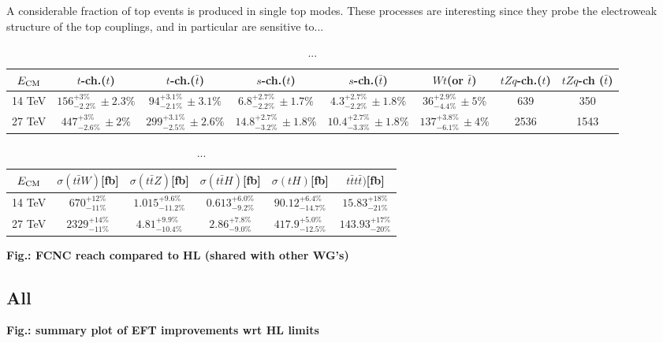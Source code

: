\documentclass{article}
\begin{document}
\vskip 0.3cm
A considerable fraction of top events is produced in single top modes. These processes
are interesting since they probe the electroweak structure of the top couplings, and
in particular are sensitive to...

\begin{table}[htb]
\caption{...}
\label{tab:singlet_yields}
\hskip-3.0cm
\begin{tabular} {|c |c  |c  |c  |c |c | c |c |}
  \hline
  $E_{\rm CM}$ & $t$-ch.($t$)   &  $t$-ch.($\bar{t}$)   &   $s$-ch.($t$) &  $s$-ch.($\bar{t}$)   &  $Wt$(or $\bar{t}$) & $tZq$-ch.($t$) & $tZq$-ch ($\bar{t}$) \\
  \hline
  14 TeV     &  $156^{+3\%}_{-2.2\%} {\scriptstyle \,\pm 2.3\%}$& $94^{+3.1\%}_{-2.1\%}{\scriptstyle\,\pm 3.1\% } $  & $6.8^{+2.7\%}_{-2.2\%}\scriptstyle\,\pm 1.7\%$    &  $4.3^{+2.7\%}_{-2.2\%}\scriptstyle\,\pm 1.8\% $       &   $36^{+2.9\%}_{-4.4\%}{\scriptstyle\,\pm 5\%}$   & 639  & 350    \\
  \hline
  27 TeV     &  $447^{+3\%}_{-2.6\%}{\scriptstyle \, \pm 2\%}$  & $299^{+3.1\%}_{-2.5\%}{\scriptstyle\,\pm 2.6\%} $  & $14.8^{+2.7\%}_{-3.2\%}{\scriptstyle\, \pm 1.8\%} $ & $10.4^{+2.7\%}_{-3.3\%}{\scriptstyle\,\pm 1.8\%} $       & $137^{+3.8\%}_{-6.1\%}{\scriptstyle\,\pm 4\%} $  &  2536 & 1543 \\
  \hline
\end{tabular}
\end{table}
\vskip 0.3cm

\begin{table}[h!]
\caption{...}
\label{tab:singlet_yields}
\begin{tabular} {|c |c   |c |c  |c  |c  |}
  \hline
  $E_{\rm CM}$     & $\sigma(t\bar{t}W)$[fb]         & $\sigma(t\bar{t}Z)$[fb]               & $\sigma(t\bar{t}H)$[fb]           & $\sigma(t H)$[fb]                  & $t\bar{t}t\bar{t})$[fb]      \\
  \hline
  14 TeV         & $670^{+12\%}_{-11\%}$  &  $1.015^{+9.6\%}_{-11.2\%}$   & $0.613^{+6.0\%}_{-9.2\%}$ & $90.12^{+6.4\%}_{-14.7\%}$ & $15.83^{+18\%}_{-21\%}$    \\
  \hline 
  27 TeV         & $2329^{+14\%}_{-11\%}$ &  $4.81 ^{+9.9\%}_{-10.4\%}$   & $2.86^{+7.8\%}_{-9.0\%}$  & $417.9^{+5.0\%}_{-12.5\%}$ & $143.93 ^{+17\%}_{-20\%}$  \\
  \hline
\end{tabular} 
\end{table}


\vskip 1cm
{\bf Fig.: FCNC reach compared to HL (shared with other WG's)}


\subsection{All}

{\bf Fig.: summary plot of EFT improvements wrt HL limits}


{}
\end{document}

